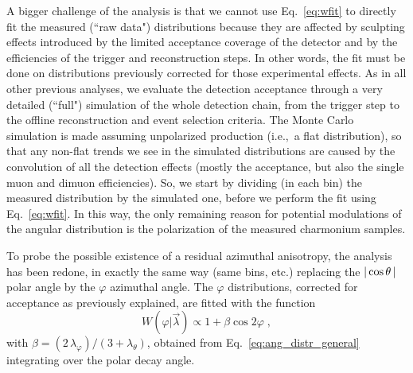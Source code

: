 A bigger challenge of the analysis is that 
we cannot use Eq.~\ref{eq:wfit} to directly fit the measured (``raw data") \costh distributions 
because they are affected by sculpting effects introduced by the limited acceptance coverage of the
detector and by the efficiencies of the trigger and reconstruction steps.
In other words, the fit must be done on distributions previously corrected for 
those experimental effects.
As in all other previous analyses, we evaluate the detection acceptance 
through a very detailed (``full") simulation of the whole detection chain, 
from the trigger step to the offline reconstruction and event selection criteria.
The Monte Carlo simulation is made assuming unpolarized production
(i.e.,\ a flat \costh distribution), so that any non-flat trends we see in 
the simulated distributions are caused by the convolution of all the 
detection effects 
(mostly the acceptance, but also the single muon and dimuon efficiencies).
So, we start by dividing (in each \pt bin) 
the measured \abscosth distribution by the simulated one, 
before we perform the fit using Eq.~\ref{eq:wfit}.
In this way, the only remaining reason for potential modulations of the angular distribution
is the polarization of the measured charmonium samples.

To probe the possible existence of a residual azimuthal anisotropy,
the analysis has been redone, in exactly the same way (same \pt bins, etc.)
replacing the $|\cos\theta \, |$ polar angle by the $\varphi$ azimuthal angle.
The $\varphi$ distributions, corrected for acceptance as previously explained, 
are fitted with the function
\begin{equation}
W(\varphi|\vec{\lambda}) \propto 1 + \beta\cos2\varphi \; ,
\label{eq:wfit-phi}
\end{equation}
with $\beta = (2 \, \lambda_\varphi) / (3+\lambda_\theta)$,
obtained from Eq.~\ref{eq:ang_distr_general} integrating over the polar decay angle.
